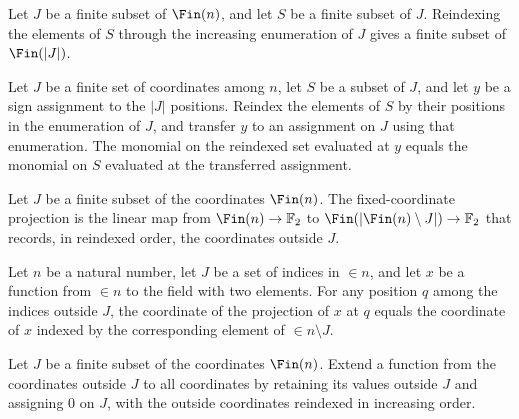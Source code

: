 \begin{definition}
\label{FABL.freeFrequencyReindex}
\leanok
Let $J$ be a finite subset of $\Fin(n)$, and let $S$ be a finite subset of $J$.
Reindexing the elements of $S$ through the increasing enumeration of $J$ gives a finite
subset of $\Fin(|J|)$.
\end{definition}

\begin{theorem}
\label{FABL.monomial_freeFrequencyReindex}
\leanok
{}
Let $J$ be a finite set of coordinates among $n$, let $S$ be a subset of $J$, and let
$y$ be a sign assignment to the $|J|$ positions. Reindex the elements of $S$ by their
positions in the enumeration of $J$, and transfer $y$ to an assignment on $J$ using that
enumeration. The monomial on the reindexed set evaluated at $y$ equals the monomial on
$S$ evaluated at the transferred assignment.
\end{theorem}

\begin{definition}
\label{FABL.fixedCoordinateProjectionLinear}
\leanok
{}
Let $J$ be a finite subset of the coordinates $\Fin(n)$. The fixed-coordinate projection
is the linear map from $\Fin(n)\to\mathbb{F}_2$ to $\Fin(|\Fin(n)\setminus
J|)\to\mathbb{F}_2$ that records, in reindexed order, the coordinates outside $J$.
\end{definition}

\begin{theorem}
\label{FABL.fixedCoordinateProjectionLinear_apply}
\leanok
{}
Let $n$ be a natural number, let $J$ be a set of indices in $\in n$, and let $x$ be a
function from $\in n$ to the field with two elements. For any position $q$ among the
indices outside $J$, the coordinate of the projection of $x$ at $q$ equals the
coordinate of $x$ indexed by the corresponding element of $\in n \setminus J$.
\end{theorem}

\begin{definition}
\label{FABL.fixedCoordinateExtension}
\leanok
{}
Let $J$ be a finite subset of the coordinates $\Fin(n)$. Extend a function from the
coordinates outside $J$ to all coordinates by retaining its values outside $J$ and
assigning $0$ on $J$, with the outside coordinates reindexed in increasing order.
\end{definition}

